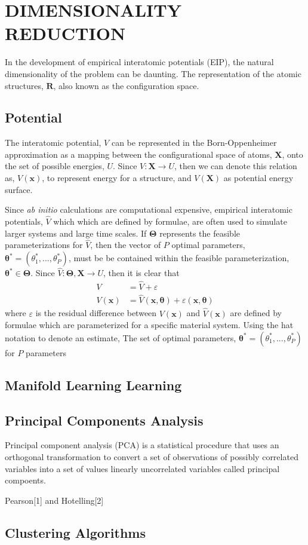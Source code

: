 \chapter{DIMENSIONALITY REDUCTION}

In the development of empirical interatomic potentials (EIP), the natural dimensionality of the problem can be daunting.
The representation of the atomic structures, $\bm{R}$, also known as the configuration space.

\section{Potential}

The interatomic potential, $V$ can be represented in the Born-Oppenheimer approximation as a mapping between the configurational space of atoms, $\bm{X}$, onto the set of possible energies, $U$.
Since $V:\bm{X} \rightarrow U$, then we can denote this relation as, $V(\bm{x})$, to represent energy for a structure, and $V(\bm{X})$ as potential energy surface.

Since \emph{ab initio} calculations are computational expensive, empirical interatomic potentials, $\hat{V}$ which which are defined by formulae, are often used to simulate larger systems and large time scales.
If $\bm{\Theta}$ represents the feasible parameterizations for $\hat{V}$, then the vector of $P$ optimal parameters, $\bm{\theta}^{*} = (\theta_1^{*},...,\theta_P^{*})$, must be be contained within the feasible parameterization, $\bm{\theta}^{*} \in \bm{\Theta}$.
Since $\hat{V}:\bm{\Theta},\bm{X} \rightarrow U$, then it is clear that
\begin{align}
  V &= \hat{V} + \varepsilon \\
  V(\bm{x}) &= \hat{V}(\bm{x},\bm{\theta}) + \varepsilon(\bm{x},\bm{\theta})
\end{align}
where $\varepsilon$ is the residual difference between $V(\bm{x})$ and $\hat{V}(\bm{x})$
 are defined by formulae which are parameterized for a specific material system.  Using the hat notation to denote an estimate,   The set of optimal parameters, $\bm{\theta}^{*} = (\theta_1^{*},...,\theta_P^{*})$ for $P$ parameters

\section{Manifold Learning Learning}

\section{Principal Components Analysis}

Principal component analysis (PCA) is a statistical procedure that uses an orthogonal transformation to convert a set of observations of possibly correlated variables into a set of values linearly uncorrelated variables called principal compoents.

Pearson[1] and Hotelling[2]

\section{Clustering Algorithms}
